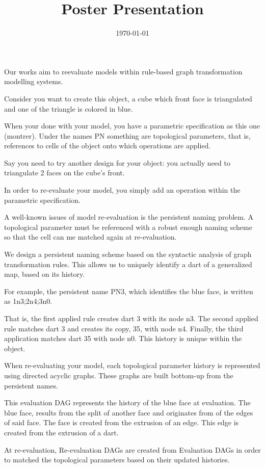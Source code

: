 \documentclass[11pt]{article}
\date{\today}
\title{Poster Presentation}
\begin{document}
\maketitle
Our works aim to reevaluate models within rule-based graph transformation
modelling systems.

Consider you want to create this object, a cube which front face is triangulated
and one of the triangle is colored in blue.

When your done with your model, you have a parametric specification as this one
(montrer). Under the names PN something are topological parameters, that is,
references to cells of the object onto which operations are applied.

Say you need to try another design for your object: you actually need to
triangulate 2 faces on the cube's front.

In order to re-evaluate your model, you simply add an operation within the
parametric specification.

A well-known issues of model re-evaluation is the persistent naming problem. A
topological parameter must be referenced with a robust enough naming scheme so
that the cell can me matched again at re-evaluation.

We design a persistent naming scheme based on the syntactic analysis of graph
transformation rules. This allows us to uniquely identify a dart of a
generalized map, based on its history.

For example, the persistent name PN3, which identifies the blue face, is written
as 1n3;2n4;3n0.

That is, the first applied rule creates dart 3 with its node n3. The second
applied rule matches dart 3 and creates its copy, 35, with node n4. Finally, the
third application matches dart 35 with node n0. This history is unique within
the object.

When re-evaluating your model, each topological parameter history is represented
using directed acyclic graphs. These graphs are built bottom-up from the
persistent names.

This evaluation DAG represents the history of the blue face at evaluation. The
blue face, results from the split of another face and originates from of the
edges of said face. The face is created from the extrusion of an edge. This edge
is created from the extrusion of a dart.

At re-evaluation, Re-evaluation DAGs are created from Evaluation DAGs in order
to matched the topological parameters based on their updated histories.
\end{document}
